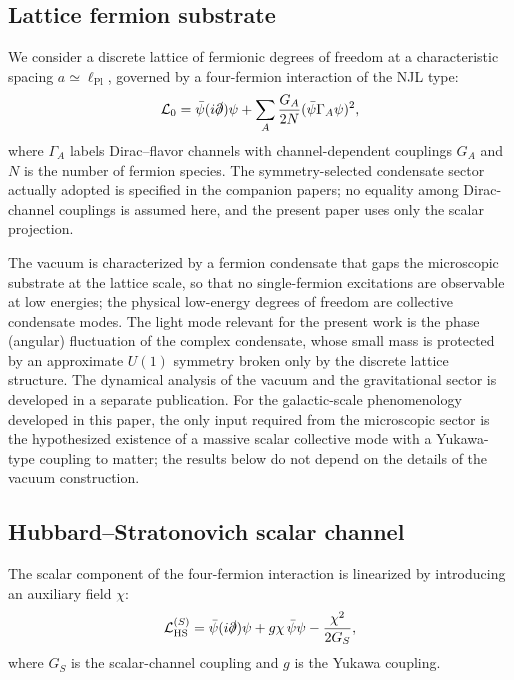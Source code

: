 \documentclass[11pt,a4paper]{article}
\begin{document}
\subsection{Lattice fermion substrate}

We consider a discrete lattice of fermionic degrees of freedom at a
characteristic spacing $a \simeq \ell_{\mathrm{Pl}}$, governed by a
four-fermion interaction of the NJL type:
\begin{equation}
\mathcal{L}_0 = \bar{\psi}(i\slashed{\partial})\psi
+ \sum_A \frac{G_A}{2N}(\bar{\psi}\Gamma_A\psi)^2,
\label{eq:L0}
\end{equation}
where $\Gamma_A$ labels Dirac--flavor channels with
channel-dependent couplings $G_A$ and $N$ is the number of fermion
species.  The symmetry-selected condensate sector actually adopted
is specified in the companion papers; no equality among
Dirac-channel couplings is assumed here, and the present paper uses
only the scalar projection.

The vacuum is characterized by a fermion condensate that gaps the
microscopic substrate at the lattice scale, so that no
single-fermion excitations are observable at low energies; the
physical low-energy degrees of freedom are collective condensate
modes.
The light mode relevant for the present work is the phase (angular)
fluctuation of the complex condensate, whose small mass is
protected by an approximate $U(1)$ symmetry broken only by the
discrete lattice structure.
The dynamical analysis of the vacuum and the gravitational sector
is developed in a separate publication.
For the galactic-scale phenomenology developed in this paper,
the only input required from the microscopic sector is the
hypothesized existence of a massive scalar collective mode with a Yukawa-type
coupling to matter; the results below do not depend on the
details of the vacuum construction.

\subsection{Hubbard--Stratonovich scalar channel}

The scalar component of the four-fermion interaction is linearized
by introducing an auxiliary field $\chi$:
\begin{equation}
\mathcal{L}_{\mathrm{HS}}^{(S)} =
\bar{\psi}(i\slashed{\partial})\psi
+ g\chi\,\bar{\psi}\psi
- \frac{\chi^2}{2G_S},
\label{eq:HS}
\end{equation}
where $G_S$ is the scalar-channel coupling and $g$ is the Yukawa
coupling.
\end{document}
